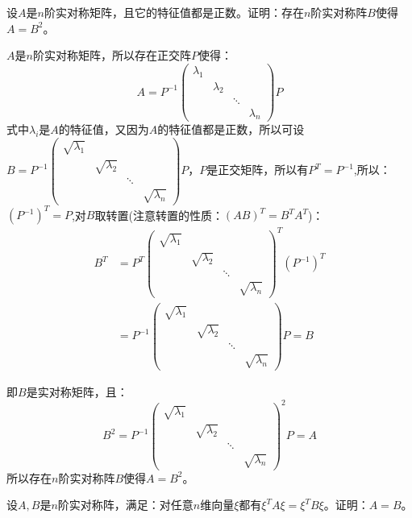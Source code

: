 \documentclass[a4paper]{report}
\begin{document}
\EX 设$A$是$n$阶实对称矩阵，且它的特征值都是正数。证明：存在$n$阶实对称阵$B$使得$A=B^2$。

\begin{zhengming}
$A$是$n$阶实对称矩阵，所以存在正交阵$P$使得：
\begin{equation*}
A=P^{-1}
\begin{pmatrix}
\lambda_1\\
&\lambda_2\\
&&\ddots\\
&&&\lambda_n
\end{pmatrix}P
\end{equation*}
式中$\lambda_i$是$A$的特征值，又因为$A$的特征值都是正数，所以可设$B=
P^{-1}
\begin{pmatrix}
\sqrt{\lambda_1}\\
&\sqrt{\lambda_2}\\
&&\ddots\\
&&&\sqrt{\lambda_n}
\end{pmatrix}P
$，$P$是正交矩阵，所以有$P^T=P^{-1}$,所以：$(P^{-1})^T=P$,对$B$取转置(注意转置的性质：$(AB)^T=B^TA^T$)：
\begin{align*}
B^T&=P^T
\begin{pmatrix}
\sqrt{\lambda_1}\\
&\sqrt{\lambda_2}\\
&&\ddots\\
&&&\sqrt{\lambda_n}
\end{pmatrix}^T(P^{-1})^T\\
&=P^{-1}
\begin{pmatrix}
\sqrt{\lambda_1}\\
&\sqrt{\lambda_2}\\
&&\ddots\\
&&&\sqrt{\lambda_n}
\end{pmatrix}P=B
\end{align*}

即$B$是实对称矩阵，且：
\begin{equation*}
B^2=P^{-1}
\begin{pmatrix}
\sqrt{\lambda_1}\\
&\sqrt{\lambda_2}\\
&&\ddots\\
&&&\sqrt{\lambda_n}
\end{pmatrix}^2P=A
\end{equation*}
所以存在$n$阶实对称阵$B$使得$A=B^2$。
\end{zhengming}

\EX 设$A,B$是$n$阶实对称阵，满足：对任意$n$维向量$\xi$都有$\xi^TA\xi=\xi^TB\xi$。证明：$A=B$。
\end{document}
